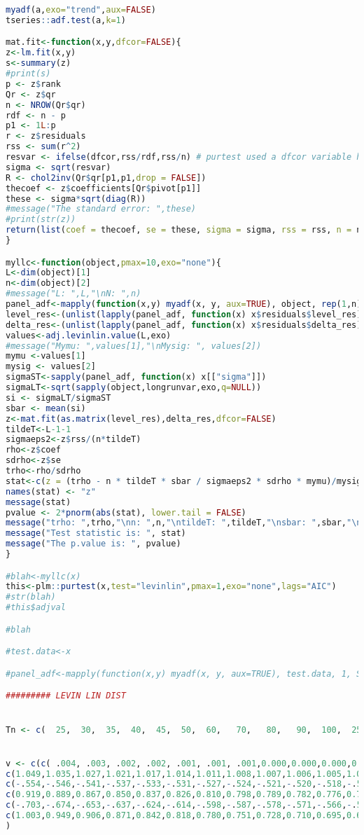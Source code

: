 \begin{lstlisting}[language=R]
myadf(a,exo="trend",aux=FALSE)
tseries::adf.test(a,k=1)

mat.fit<-function(x,y,dfcor=FALSE){
z<-lm.fit(x,y)
s<-summary(z)
#print(s)
p <- z$rank
Qr <- z$qr
n <- NROW(Qr$qr)
rdf <- n - p
p1 <- 1L:p
r <- z$residuals
rss <- sum(r^2)
resvar <- ifelse(dfcor,rss/rdf,rss/n) # purtest used a dfcor variable here...
sigma <- sqrt(resvar)
R <- chol2inv(Qr$qr[p1,p1,drop = FALSE])
thecoef <- z$coefficients[Qr$pivot[p1]]
these <- sigma*sqrt(diag(R))
#message("The standard error: ",these)
#print(str(z))
return(list(coef = thecoef, se = these, sigma = sigma, rss = rss, n = n, K = p, rdf = rdf))
}

myllc<-function(object,pmax=10,exo="none"){
L<-dim(object)[1]
n<-dim(object)[2]
#message("L: ",L,"\nN: ",n)
panel_adf<-mapply(function(x,y) myadf(x, y, aux=TRUE), object, rep(1,n), SIMPLIFY=FALSE)
level_res<-(unlist(lapply(panel_adf, function(x) x$residuals$level_res)))
delta_res<-(unlist(lapply(panel_adf, function(x) x$residuals$delta_res)))
values<-adj.levinlin.value(L,exo)
#message("Mymu: ",values[1],"\nMysig: ", values[2])
mymu <-values[1]
mysig <- values[2]
sigmaST<-sapply(panel_adf, function(x) x[["sigma"]])
sigmaLT<-sqrt(sapply(object,longrunvar,exo,q=NULL))
si <- sigmaLT/sigmaST
sbar <- mean(si)
z<-mat.fit(as.matrix(level_res),delta_res,dfcor=FALSE)
tildeT<-L-1-1
sigmaeps2<-z$rss/(n*tildeT)
rho<-z$coef
sdrho<-z$se
trho<-rho/sdrho
stat<-c(z = (trho - n * tildeT * sbar / sigmaeps2 * sdrho * mymu)/mysig)
names(stat) <- "z"
message(stat)
pvalue <- 2*pnorm(abs(stat), lower.tail = FALSE)
message("trho: ",trho,"\nn: ",n,"\ntildeT: ",tildeT,"\nsbar: ",sbar,"\nsigmaeps2: ", sigmaeps2,"\nsdrho: ",sdrho,"\nmymu: ",mymu,"\nmysig: ",mysig,"\nrho: ",rho)
message("Test statistic is: ", stat)
message("The p.value is: ", pvalue)
}

#blah<-myllc(x)
this<-plm::purtest(x,test="levinlin",pmax=1,exo="none",lags="AIC")
#str(blah)
#this$adjval

#blah

#test.data<-x

#panel_adf<-mapply(function(x,y) myadf(x, y, aux=TRUE), test.data, 1, SIMPLIFY=FALSE)

######### LEVIN LIN DIST


Tn <- c(  25,  30,  35,  40,  45,  50,  60,   70,   80,   90,  100,  250,   500) 


v <- c(c( .004, .003, .002, .002, .001, .001, .001,0.000,0.000,0.000,0.000,0.000,0.000), 
c(1.049,1.035,1.027,1.021,1.017,1.014,1.011,1.008,1.007,1.006,1.005,1.001,1.000), 
c(-.554,-.546,-.541,-.537,-.533,-.531,-.527,-.524,-.521,-.520,-.518,-.509,-.500), 
c(0.919,0.889,0.867,0.850,0.837,0.826,0.810,0.798,0.789,0.782,0.776,0.742,0.707), 
c(-.703,-.674,-.653,-.637,-.624,-.614,-.598,-.587,-.578,-.571,-.566,-.533,-.500), 
c(1.003,0.949,0.906,0.871,0.842,0.818,0.780,0.751,0.728,0.710,0.695,0.603,0.500) 
) 


\end{lstlisting}
